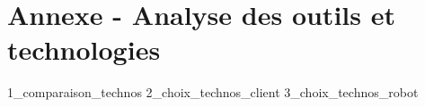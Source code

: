 \section{Annexe - Analyse des outils et technologies} \label{sec:annexes_a}

{1_comparaison_technos}
{2_choix_technos_client}
{3_choix_technos_robot}

